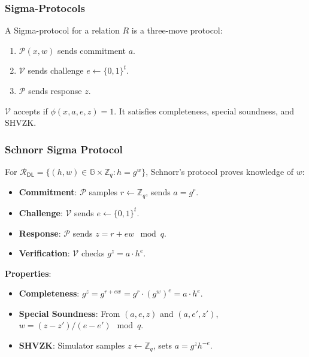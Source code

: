 \subsubsection{Sigma-Protocols}\label{preliminaries-sigmaprotocol}
\begin{definition}
    A Sigma-protocol for a relation $R$ is a three-move protocol:
    \begin{enumerate}
        \item $\mathcal{P}(x, w)$ sends commitment $a$.
        \item $\mathcal{V}$ sends challenge $e \leftarrow \{0,1\}^t$.
        \item $\mathcal{P}$ sends response $z$.
    \end{enumerate}
    $\mathcal{V}$ accepts if $\phi(x, a, e, z) = 1$. It satisfies completeness, special soundness, and SHVZK.
\end{definition}

\subsubsection{Schnorr Sigma Protocol}
For $\mathcal{R}_{\mathsf{DL}} = \{(h, w) \in \mathbb{G} \times \mathbb{Z}_q : h = g^w\}$, Schnorr’s protocol proves knowledge of $w$:
\begin{itemize}
    \item \textbf{Commitment}: $\mathcal{P}$ samples $r \leftarrow \mathbb{Z}_q$, sends $a = g^r$.
    \item \textbf{Challenge}: $\mathcal{V}$ sends $e \leftarrow \{0,1\}^t$.
    \item \textbf{Response}: $\mathcal{P}$ sends $z = r + e w \mod q$.
    \item \textbf{Verification}: $\mathcal{V}$ checks $g^z = a \cdot h^e$.
\end{itemize}
\textbf{Properties}:
\begin{itemize}
    \item \textbf{Completeness}: $g^z = g^{r + e w} = g^r \cdot (g^w)^e = a \cdot h^e$.
    \item \textbf{Special Soundness}: From $(a, e, z)$ and $(a, e', z')$, $w = (z - z') / (e - e') \mod q$.
    \item \textbf{SHVZK}: Simulator samples $z \leftarrow \mathbb{Z}_q$, sets $a = g^z h^{-e}$.
\end{itemize}


































